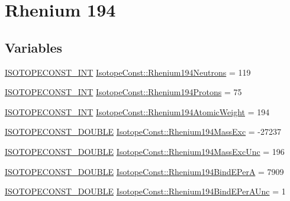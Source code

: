 \hypertarget{group___isotope_const-_rhenium-_re194}{}\section{Rhenium 194}
\label{group___isotope_const-_rhenium-_re194}
\subsection*{Variables}
\begin{DoxyCompactItemize}
\item 
\mbox{\hyperlink{group___isotope_const-_macros_ga5f18360b3e99483a35c32d789e62621c}{I\+S\+O\+T\+O\+P\+E\+C\+O\+N\+S\+T\+\_\+\+I\+NT}} \mbox{\hyperlink{group___isotope_const-_rhenium-_re194_ga978553b8cf92c211c38561ee87b619bf}{Isotope\+Const\+::\+Rhenium194\+Neutrons}} = 119
\item 
\mbox{\hyperlink{group___isotope_const-_macros_ga5f18360b3e99483a35c32d789e62621c}{I\+S\+O\+T\+O\+P\+E\+C\+O\+N\+S\+T\+\_\+\+I\+NT}} \mbox{\hyperlink{group___isotope_const-_rhenium-_re194_ga3477d09ae3eb955b2868533910614c5f}{Isotope\+Const\+::\+Rhenium194\+Protons}} = 75
\item 
\mbox{\hyperlink{group___isotope_const-_macros_ga5f18360b3e99483a35c32d789e62621c}{I\+S\+O\+T\+O\+P\+E\+C\+O\+N\+S\+T\+\_\+\+I\+NT}} \mbox{\hyperlink{group___isotope_const-_rhenium-_re194_ga93ddd715a6cbddad70ba1b4a765c8037}{Isotope\+Const\+::\+Rhenium194\+Atomic\+Weight}} = 194
\item 
\mbox{\hyperlink{group___isotope_const-_macros_ga8f45a7272ce02c0b4c65c44636ed719a}{I\+S\+O\+T\+O\+P\+E\+C\+O\+N\+S\+T\+\_\+\+D\+O\+U\+B\+LE}} \mbox{\hyperlink{group___isotope_const-_rhenium-_re194_gaf83cfa8598df08c72d92512c2424aaa6}{Isotope\+Const\+::\+Rhenium194\+Mass\+Exc}} = -\/27237
\item 
\mbox{\hyperlink{group___isotope_const-_macros_ga8f45a7272ce02c0b4c65c44636ed719a}{I\+S\+O\+T\+O\+P\+E\+C\+O\+N\+S\+T\+\_\+\+D\+O\+U\+B\+LE}} \mbox{\hyperlink{group___isotope_const-_rhenium-_re194_gacd88260165d774ded3379c4573541b2c}{Isotope\+Const\+::\+Rhenium194\+Mass\+Exc\+Unc}} = 196
\item 
\mbox{\hyperlink{group___isotope_const-_macros_ga8f45a7272ce02c0b4c65c44636ed719a}{I\+S\+O\+T\+O\+P\+E\+C\+O\+N\+S\+T\+\_\+\+D\+O\+U\+B\+LE}} \mbox{\hyperlink{group___isotope_const-_rhenium-_re194_gae73a330e4c0e6d16327cde2e46192500}{Isotope\+Const\+::\+Rhenium194\+Bind\+E\+PerA}} = 7909
\item 
\mbox{\hyperlink{group___isotope_const-_macros_ga8f45a7272ce02c0b4c65c44636ed719a}{I\+S\+O\+T\+O\+P\+E\+C\+O\+N\+S\+T\+\_\+\+D\+O\+U\+B\+LE}} \mbox{\hyperlink{group___isotope_const-_rhenium-_re194_ga0b8b12c9fd755b754dea0de26f5de371}{Isotope\+Const\+::\+Rhenium194\+Bind\+E\+Per\+A\+Unc}} = 1

\end{DoxyCompactItemize}

